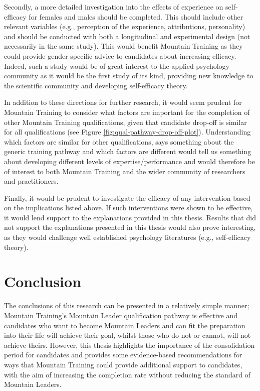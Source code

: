 \documentclass[
  12pt,
  a4paper,
]{book}
\begin{document}
Secondly, a more detailed investigation into the effects of experience on self-efficacy for females and males should be completed. This should include other relevant variables (e.g., perception of the experience, attributions, personality) and should be conducted with both a longitudinal and experimental design (not necessarily in the same study). This would benefit Mountain Training as they could provide gender specific advice to candidates about increasing efficacy. Indeed, such a study would be of great interest to the applied psychology community as it would be the first study of its kind, providing new knowledge to the scientific community and developing self-efficacy theory.

In addition to these directions for further research, it would seem prudent for Mountain Training to consider what factors are important for the completion of other Mountain Training qualifications, given that candidate drop-off is similar for all qualifications (see Figure \ref{fig:qual-pathway-drop-off-plot}). Understanding which factors are similar for other qualifications, says something about the generic training pathway and which factors are different would tell us something about developing different levels of expertise/performance and would therefore be of interest to both Mountain Training and the wider community of researchers and practitioners.

Finally, it would be prudent to investigate the efficacy of any intervention based on the implications listed above. If such interventions were shown to be effective, it would lend support to the explanations provided in this thesis. Results that did not support the explanations presented in this thesis would also prove interesting, as they would challenge well established psychology literatures (e.g., self-efficacy theory).

\hypertarget{general-discussion-conclusion}{%
\section{Conclusion}\label{general-discussion-conclusion}}

The conclusions of this research can be presented in a relatively simple manner; Mountain Training's Mountain Leader qualification pathway is effective and candidates who want to become Mountain Leaders and can fit the preparation into their life will achieve their goal, whilst those who do not or cannot, will not achieve theirs. However, this thesis highlights the importance of the consolidation period for candidates and provides some evidence-based recommendations for ways that Mountain Training could provide additional support to candidates, with the aim of increasing the completion rate without reducing the standard of Mountain Leaders.
\end{document}
